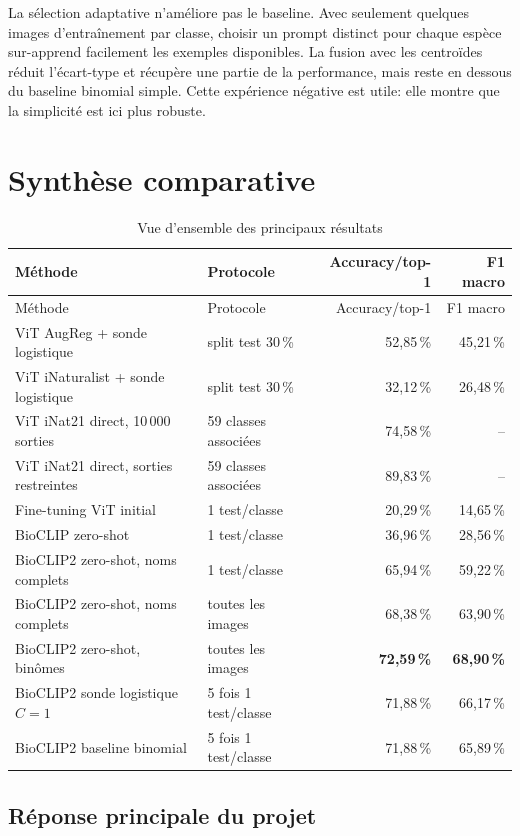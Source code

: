 \documentclass[11pt,a4paper]{report}
\newcommand{\pct}[1]{#1\,\%}
\begin{document}
La sélection adaptative n'améliore pas le baseline. Avec seulement quelques
images d'entraînement par classe, choisir un prompt distinct pour chaque espèce
sur-apprend facilement les exemples disponibles. La fusion avec les centroïdes
réduit l'écart-type et récupère une partie de la performance, mais reste en dessous
du baseline binomial simple. Cette expérience négative est utile: elle montre que
la simplicité est ici plus robuste.

\chapter{Synthèse comparative}

\begin{longtable}{p{5.9cm}p{3.2cm}rr}
\caption{Vue d'ensemble des principaux résultats}\label{tab:synthese}\\
\toprule
Méthode & Protocole & Accuracy/top-1 & F1 macro \\
\midrule
\endfirsthead
\toprule
Méthode & Protocole & Accuracy/top-1 & F1 macro \\
\midrule
\endhead
ViT AugReg + sonde logistique & split test \pct{30} & \pct{52,85} & \pct{45,21} \\
ViT iNaturalist + sonde logistique & split test \pct{30} & \pct{32,12} & \pct{26,48} \\
ViT iNat21 direct, 10\,000 sorties & 59 classes associées & \pct{74,58} & -- \\
ViT iNat21 direct, sorties restreintes & 59 classes associées & \pct{89,83} & -- \\
Fine-tuning ViT initial & 1 test/classe & \pct{20,29} & \pct{14,65} \\
BioCLIP zero-shot & 1 test/classe & \pct{36,96} & \pct{28,56} \\
BioCLIP2 zero-shot, noms complets & 1 test/classe & \pct{65,94} & \pct{59,22} \\
BioCLIP2 zero-shot, noms complets & toutes les images & \pct{68,38} & \pct{63,90} \\
BioCLIP2 zero-shot, binômes & toutes les images & \textbf{\pct{72,59}} & \textbf{\pct{68,90}} \\
BioCLIP2 sonde logistique $C=1$ & 5 fois 1 test/classe & \pct{71,88} & \pct{66,17} \\
BioCLIP2 baseline binomial & 5 fois 1 test/classe & \pct{71,88} & \pct{65,89} \\
\bottomrule
\end{longtable}

\section{Réponse principale du projet}
\end{document}
